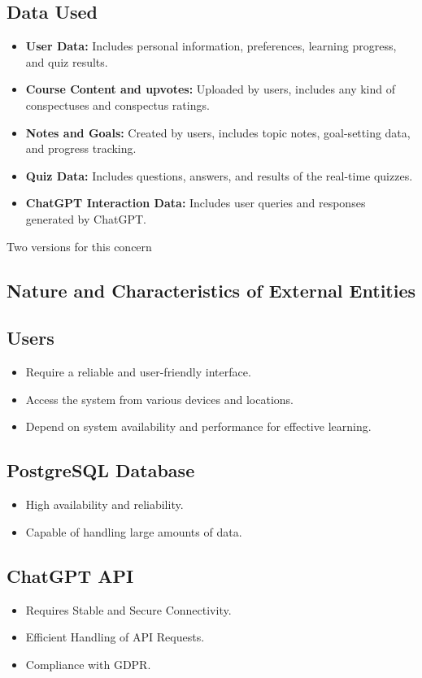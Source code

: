 \subsection*{Data Used}
\begin{itemize}
    \item \textbf{User Data:} Includes personal information, preferences, learning progress, and quiz results.
    \item \textbf{Course Content and upvotes:} Uploaded by users, includes any kind of conspectuses and conspectus ratings.
    \item \textbf{Notes and Goals:} Created by users, includes topic notes, goal-setting data, and progress tracking.
    \item \textbf{Quiz Data:} Includes questions, answers, and results of the real-time quizzes.
    \item \textbf{ChatGPT Interaction Data:} Includes user queries and responses generated by ChatGPT.
\end{itemize}

Two versions for this concern

\subsection{Nature and Characteristics of External Entities}

\subsection*{Users}
\begin{itemize}
    \item Require a reliable and user-friendly interface.
    \item Access the system from various devices and locations.
    \item Depend on system availability and performance for effective learning.
\end{itemize}

\subsection*{PostgreSQL Database}
\begin{itemize}
    \item High availability and reliability.
    \item Capable of handling large amounts of data.
\end{itemize}

\subsection*{ChatGPT API}
\begin{itemize}
    \item Requires Stable and Secure Connectivity.
    \item Efficient Handling of API Requests.
    \item Compliance with GDPR.
\end{itemize}


